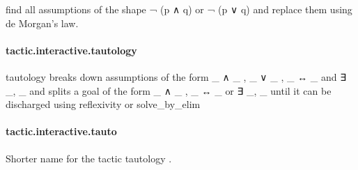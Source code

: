 \documentclass{article}
\begin{document}
\par
find all assumptions of the shape 
\colorbox[RGB]{253,246,227}{{{{\color[RGB]{181, 137, 0} ¬ }}}{{{\color[RGB]{101, 123, 131}  (p  }}}{{{\color[RGB]{181, 137, 0} ∧ }}}{{{\color[RGB]{101, 123, 131}  q) }}}} or 
\colorbox[RGB]{253,246,227}{{{{\color[RGB]{181, 137, 0} ¬ }}}{{{\color[RGB]{101, 123, 131}  (p  }}}{{{\color[RGB]{181, 137, 0} ∨ }}}{{{\color[RGB]{101, 123, 131}  q) }}}} and
replace them using de Morgan's law.
\paragraph{tactic.interactive.tautology}
\par
\colorbox[RGB]{253,246,227}{{{{\color[RGB]{101, 123, 131} tautology }}}} breaks down assumptions of the form 
\colorbox[RGB]{253,246,227}{{{{\color[RGB]{101, 123, 131} \_  }}}{{{\color[RGB]{181, 137, 0} ∧ }}}{{{\color[RGB]{101, 123, 131}  \_ }}}}, 
\colorbox[RGB]{253,246,227}{{{{\color[RGB]{101, 123, 131} \_  }}}{{{\color[RGB]{181, 137, 0} ∨ }}}{{{\color[RGB]{101, 123, 131}  \_ }}}}, 
\colorbox[RGB]{253,246,227}{{{{\color[RGB]{101, 123, 131} \_  }}}{{{\color[RGB]{181, 137, 0} ↔ }}}{{{\color[RGB]{101, 123, 131}  \_ }}}} and 
\colorbox[RGB]{253,246,227}{{{{\color[RGB]{101, 123, 131} ∃ \_, \_ }}}}and splits a goal of the form 
\colorbox[RGB]{253,246,227}{{{{\color[RGB]{101, 123, 131} \_  }}}{{{\color[RGB]{181, 137, 0} ∧ }}}{{{\color[RGB]{101, 123, 131}  \_ }}}}, 
\colorbox[RGB]{253,246,227}{{{{\color[RGB]{101, 123, 131} \_  }}}{{{\color[RGB]{181, 137, 0} ↔ }}}{{{\color[RGB]{101, 123, 131}  \_ }}}} or 
\colorbox[RGB]{253,246,227}{{{{\color[RGB]{101, 123, 131} ∃ \_, \_ }}}} until it can be discharged
using 
\colorbox[RGB]{253,246,227}{{{{\color[RGB]{101, 123, 131} reflexivity }}}} or 
\colorbox[RGB]{253,246,227}{{{{\color[RGB]{101, 123, 131} solve\_by\_elim }}}}\paragraph{tactic.interactive.tauto}
\par
Shorter name for the tactic 
\colorbox[RGB]{253,246,227}{{{{\color[RGB]{101, 123, 131} tautology }}}}.
\end{document}
